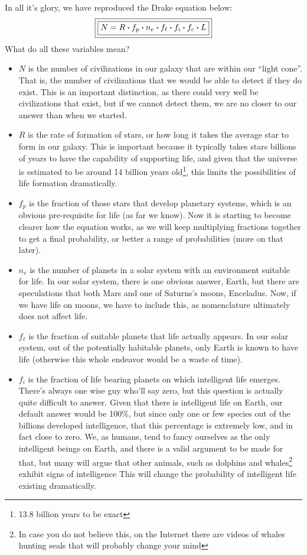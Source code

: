 \documentclass[../../fulltext/fulltext.tex]{subfiles}
\begin{document}
In all it's glory, we have reproduced the Drake equation below:
\begin{equation}
\boxed{\boxed{N=R\vdot f_p\vdot n_e\vdot f_\ell\vdot f_i\vdot f_c\vdot L}}
\end{equation}
What do all these variables mean? 
\begin{itemize}
\item 	$N$ is the number of civilizations in our galaxy that are within our ``light cone''.  That is, the number of civilizations that we would be able to detect if they do exist.  This is an important distinction, as there could very well be civilizations that exist, but if we cannot detect them, we are no closer to our answer than when we started. 
\item $R$ is the rate of formation of stars, or how long it takes the average star to form in our galaxy.  This is important because it typically takes stars billions of years to have the capability of supporting life, and given that the universe is estimated to be around 14 billion years old\cite{universeage}\footnote{13.8 billion years to be exact}, this limits the possibilities of life formation dramatically.
\cite{space.com}  
\item $f_p$ is the fraction of those stars that develop planetary systems, which is an obvious pre-requisite for life (as far we know). Now it is starting to become clearer how the equation works, as we will keep multiplying fractions together to get a final probability, or better a range of probabilities (more on that later).
\item $n_e$ is the number of planets in a solar system with an environment suitable for life.  In our solar system, there is one obvious answer, Earth, but there are speculations that both Mars and one of Saturns's moons, Enceladus\cite{lifenasa}.  Now, if we have life on moons, we have to include this, as nomenclature ultimately does not affect life.
\item $f_\ell$ is the fraction of suitable planets that life actually appears.  In our solar system, out of the potentially habitable planets, only Earth is known to have life (otherwise this whole endeavor would be a waste of time).  
\item $f_i$ is the fraction of life bearing planets on which intelligent life emerges.  There's always one wise guy who'll say zero, but this question is actually quite difficult to answer. Given that there is intelligent life on Earth, our default answer would be 100\%, but since only one or few species out of the billions developed intelligence, that this percentage is extremely low, and in fact close to zero.  We, as humans, tend to fancy ourselves as the only intelligent beings on Earth, and there is a valid argument to be made for that, but many will argue that other animals, such as dolphins and whales\footnote{In case you do not believe this, on the Internet there are videos of whales hunting seals that will probably change your mind}  exhibit signs of intelligence\cite{dolphinssmart}   This will change the probability of intelligent life existing dramatically.

\end{itemize}
\end{document}
